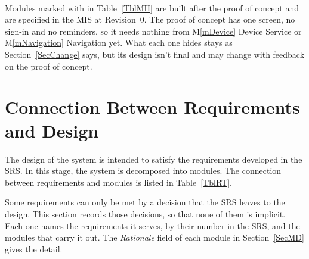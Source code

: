 \documentclass[12pt, titlepage]{article}
\newcommand{\mref}[1]{M\ref{#1}}
\begin{document}
Modules marked with \textsuperscript{\dag} in Table~\ref{TblMH} are built after
the proof of concept and are specified in the MIS at Revision~0. The proof of
concept has one screen, no sign-in and no reminders, so it needs nothing from
\mref{mDevice} Device Service or \mref{mNavigation} Navigation yet. What each
one hides stays as Section~\ref{SecChange} says, but its design isn't final
and may change with feedback on the proof of concept.

\section{Connection Between Requirements and Design} \label{SecConnection}

The design of the system is intended to satisfy the requirements developed in
the SRS. In this stage, the system is decomposed into modules. The connection
between requirements and modules is listed in Table~\ref{TblRT}.


Some requirements can only be met by a decision that the SRS leaves to the
design. This section records those decisions, so that none of them is implicit.
Each one names the requirements it serves, by their number in the SRS, and the
modules that carry it out. The \emph{Rationale} field of each module in
Section~\ref{SecMD} gives the detail.
\end{document}

